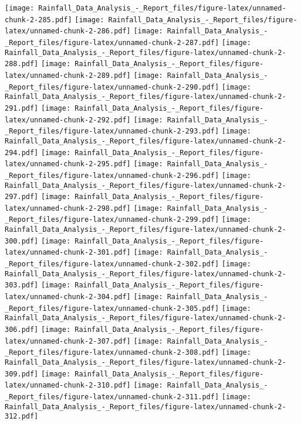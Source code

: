 \documentclass[
]{article}
\begin{document}
\texttt{[image: Rainfall\_Data\_Analysis\_-\_Report\_files/figure-latex/unnamed-chunk-2-285.pdf]}
\texttt{[image: Rainfall\_Data\_Analysis\_-\_Report\_files/figure-latex/unnamed-chunk-2-286.pdf]}
\texttt{[image: Rainfall\_Data\_Analysis\_-\_Report\_files/figure-latex/unnamed-chunk-2-287.pdf]}
\texttt{[image: Rainfall\_Data\_Analysis\_-\_Report\_files/figure-latex/unnamed-chunk-2-288.pdf]}
\texttt{[image: Rainfall\_Data\_Analysis\_-\_Report\_files/figure-latex/unnamed-chunk-2-289.pdf]}
\texttt{[image: Rainfall\_Data\_Analysis\_-\_Report\_files/figure-latex/unnamed-chunk-2-290.pdf]}
\texttt{[image: Rainfall\_Data\_Analysis\_-\_Report\_files/figure-latex/unnamed-chunk-2-291.pdf]}
\texttt{[image: Rainfall\_Data\_Analysis\_-\_Report\_files/figure-latex/unnamed-chunk-2-292.pdf]}
\texttt{[image: Rainfall\_Data\_Analysis\_-\_Report\_files/figure-latex/unnamed-chunk-2-293.pdf]}
\texttt{[image: Rainfall\_Data\_Analysis\_-\_Report\_files/figure-latex/unnamed-chunk-2-294.pdf]}
\texttt{[image: Rainfall\_Data\_Analysis\_-\_Report\_files/figure-latex/unnamed-chunk-2-295.pdf]}
\texttt{[image: Rainfall\_Data\_Analysis\_-\_Report\_files/figure-latex/unnamed-chunk-2-296.pdf]}
\texttt{[image: Rainfall\_Data\_Analysis\_-\_Report\_files/figure-latex/unnamed-chunk-2-297.pdf]}
\texttt{[image: Rainfall\_Data\_Analysis\_-\_Report\_files/figure-latex/unnamed-chunk-2-298.pdf]}
\texttt{[image: Rainfall\_Data\_Analysis\_-\_Report\_files/figure-latex/unnamed-chunk-2-299.pdf]}
\texttt{[image: Rainfall\_Data\_Analysis\_-\_Report\_files/figure-latex/unnamed-chunk-2-300.pdf]}
\texttt{[image: Rainfall\_Data\_Analysis\_-\_Report\_files/figure-latex/unnamed-chunk-2-301.pdf]}
\texttt{[image: Rainfall\_Data\_Analysis\_-\_Report\_files/figure-latex/unnamed-chunk-2-302.pdf]}
\texttt{[image: Rainfall\_Data\_Analysis\_-\_Report\_files/figure-latex/unnamed-chunk-2-303.pdf]}
\texttt{[image: Rainfall\_Data\_Analysis\_-\_Report\_files/figure-latex/unnamed-chunk-2-304.pdf]}
\texttt{[image: Rainfall\_Data\_Analysis\_-\_Report\_files/figure-latex/unnamed-chunk-2-305.pdf]}
\texttt{[image: Rainfall\_Data\_Analysis\_-\_Report\_files/figure-latex/unnamed-chunk-2-306.pdf]}
\texttt{[image: Rainfall\_Data\_Analysis\_-\_Report\_files/figure-latex/unnamed-chunk-2-307.pdf]}
\texttt{[image: Rainfall\_Data\_Analysis\_-\_Report\_files/figure-latex/unnamed-chunk-2-308.pdf]}
\texttt{[image: Rainfall\_Data\_Analysis\_-\_Report\_files/figure-latex/unnamed-chunk-2-309.pdf]}
\texttt{[image: Rainfall\_Data\_Analysis\_-\_Report\_files/figure-latex/unnamed-chunk-2-310.pdf]}
\texttt{[image: Rainfall\_Data\_Analysis\_-\_Report\_files/figure-latex/unnamed-chunk-2-311.pdf]}
\texttt{[image: Rainfall\_Data\_Analysis\_-\_Report\_files/figure-latex/unnamed-chunk-2-312.pdf]}
\end{document}
